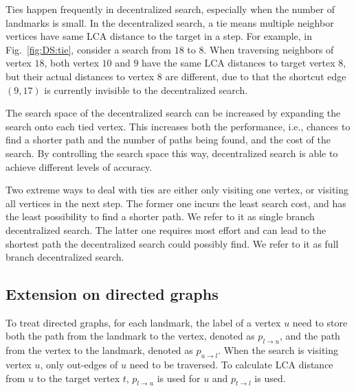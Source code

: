 Ties happen frequently in decentralized search, especially when the number of landmarks is small. In the decentralized search, a tie means multiple neighbor vertices have same LCA distance to the target in a step. 
For example, in Fig.~\ref{fig:DS:tie}, consider a search from $18$ to $8$. When traversing neighbors of vertex $18$, both vertex $10$ and $9$ have the same LCA distances to target vertex $8$, but their actual distances to vertex $8$ are different, due to that the shortcut edge $(9, 17)$ is currently invisible to the decentralized search.

The search space of the decentralized search can be increased by expanding the search onto each tied vertex. This increases both the performance, i.e., chances to find a shorter path and the number of paths being found, and the cost of the search. By controlling the search space this way, decentralized search is able to achieve different levels of accuracy.

Two extreme ways to deal with ties are either only visiting one vertex, or visiting all vertices in the next step. The former one incurs the least search cost, and has the least possibility to find a shorter path. We refer to it as single branch decentralized search. The latter one requires most effort and can lead to the shortest path the decentralized search could possibly find. We refer to it as full branch decentralized search.

\subsection{Extension on directed graphs}
To treat directed graphs, for each landmark, the label of a vertex $u$ need to store both the path from the landmark to the vertex, denoted as $p_{l \rightarrow u}$, and the path from the vertex to the landmark, denoted as $p_{u \rightarrow l}$. When the search is visiting vertex $u$, only out-edges of $u$ need to be traversed. To calculate LCA distance from $u$ to the target vertex $t$, $p_{l \rightarrow u}$ is used for $u$ and $p_{t \rightarrow l}$ is used.
